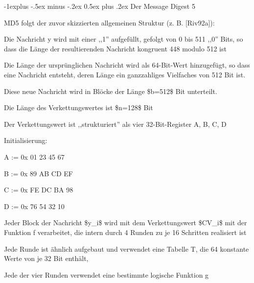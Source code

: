 \documentclass[a4paper]{article}
\makeatletter
\renewcommand{\subsection}{\@startsection{subsection}{2}{0mm}%
 {-1explus -.5ex minus -.2ex}%
 {0.5ex plus .2ex}%
 {\normalfont\normalsize\bfseries}}
\makeatother
\begin{document}
\begin{multicols}{3}
      \subsection{Der Message Digest 5}

      \begin{itemize*}
            \item MD5 folgt der zuvor skizzierten allgemeinen Struktur (z. B.
            {[}Riv92a{]}):
            \begin{itemize*}
                  \item Die Nachricht y wird mit einer ,,1'' aufgefüllt, gefolgt von 0 bis 511 ,,0'' Bits, so dass die Länge der resultierenden Nachricht kongruent 448 modulo 512 ist
                  \item Die Länge der ursprünglichen Nachricht wird als 64-Bit-Wert hinzugefügt, so dass eine Nachricht entsteht, deren Länge ein ganzzahliges Vielfaches von 512 Bit ist.
                  \item Diese neue Nachricht wird in Blöcke der Länge \$b=512\$ Bit unterteilt.
                  \item Die Länge des Verkettungswertes ist \$n=128\$ Bit
                  \begin{itemize*} \item Der Verkettungswert ist ,,strukturiert'' als vier 32-Bit-Register A, B, C, D \item Initialisierung:
                        \begin{itemize*} \item A := 0x 01 23 45 67 \item B := 0x 89 AB CD EF \item C := 0x FE DC BA 98 \item D := 0x 76 54 32 10 \end{itemize*} \end{itemize*}
                  \item Jeder Block der Nachricht \$y\_i\$ wird mit dem Verkettungswert \$CV\_i\$ mit der Funktion f verarbeitet, die intern durch 4 Runden zu je 16 Schritten realisiert ist
                  \begin{itemize*} \item Jede Runde ist ähnlich aufgebaut und verwendet eine Tabelle T, die 64 konstante Werte von je 32 Bit enthält, \item Jede der vier Runden verwendet eine bestimmte logische Funktion g \end{itemize*}
            \end{itemize*}

\end{itemize*}
\end{multicols}
\end{document}
